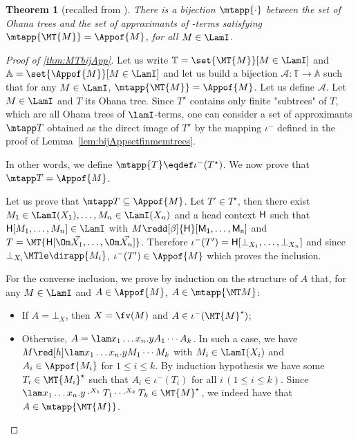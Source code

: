 \documentclass[10pt,a4paper]{amsart}
\newtheorem{theorem}{Theorem}
\theoremstyle{definition}
\providecommand{\todo}[2][]{}
\newcommand{\comasi}[1]	{\todo[color=cyan,inline]	{Alex: #1}}
\providecommand{\cal}{\mathcal}
\begin{document}
\begin{theorem}[recalled from ]
	There is a bijection $\mtapp{\cdot}$ between the set of Ohana trees 
	and the set of approximants of \lamI-terms satisfying 
	$\mtapp{\MT{M}} = \Appof{M}$, for all $M\in\LamI$.
\end{theorem}


\begin{proof}[Proof of \cref{thm:MTbijApp}] 
	Let us write $\mathbb{T} = \set{\MT{M}}[M\in\LamI]$ and 
	$\mathbb{A} = \set{\Appof{M}}[M\in\LamI]$ and 
	let us build a bijection ${\cal A}: \mathbb{T} \rightarrow \mathbb{A}$ 
	such that for any $M\in\LamI$, $\mtapp{\MT{M}} = \Appof{M}$.
	Let us define ${\cal A}$.
	Let $M\in\LamI$ and $T$ its Ohana tree. 
	Since $T^\star$ contains only finite "subtrees" of $T$, 
	which are all Ohana trees of $\lamI$-terms, 
	one can consider a set of approximants $\mtapp T$ obtained 
	as the direct image of $T^\star$ by the mapping $\iota^-$
	defined in the proof of Lemma~\ref{lem:bijAppsetfinmemtrees}. 
	
	In other words, we define $\mtapp{T} \eqdef \iota^-(T^\star)$. 
	We now prove that $\mtapp T = \Appof{M}$.
	
	Let us prove that $\mtapp T \subseteq \Appof{M}$.
	Let $T'\in T^\star$, then there exist 
	$ M_1\in\LamI(X_1), \dots, M_n\in \LamI(X_n)$ and 
	a head context ${\sf H}$ such that 
	${\sf H}[M_1,\dots, M_n] \in\LamI$ 
	with $M\redd[\beta] {\sf H}[M_1,\dots, M_n]$ 
	and $T = \MT{{\sf H}[\Om\vec{X_1},\dots, \Om\vec{X_n}]}$.
	Therefore $\iota^-(T') = {\sf H}[\bot_{X_1}, \dots, \bot_{X_n}]$ 
	and since $\bot_{X_i}\MTle \dirapp{M_i}$, $\iota^-(T') \in\Appof{M}$ 
	which proves the inclusion. 
	
	For the converse inclusion, 
	we prove by induction on the structure of $A$ that, for any $M\in\LamI$ 
	and $A\in\Appof{M}$, $A\in\mtapp{\MT M}$:
	\begin{itemize}
		\item If $A= \bot_X$, then $X = \fv(M)$ and 
		$A\in \iota^-(\MT{M}^\star)$;
		\item Otherwise, $A = \lam x_1\ldots x_n.yA_1\cdots A_k$. 
		In such a case, we have $M\red[h] \lam x_1\ldots x_n.yM_1\cdots M_k$ 
		with $M_i\in\LamI(X_i)$ and $A_i\in\Appof{M_i}$ 
		for $1\leq i \leq k$. 
		By induction hypothesis we have some $T_i \in\MT{M_i}^\star$ 
		such that $A_i\in \iota^-(T_i)$ for all $i\,(1\leq i \leq k)$. 
		Since $\lam x_1\ldots x_n.y \cdot^{X_1} T_1 \cdots^{X_k} T_k 
		\in\MT{M}^\star$, we indeed have that $A \in \mtapp{\MT{M}}$.
	\end{itemize}
	

\end{proof}
\end{document}
